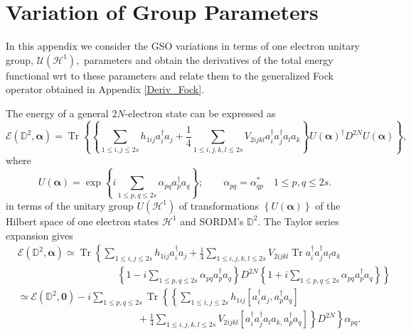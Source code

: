 \documentclass[titlepage]{article}%
\begin{document}
\section{Variation of Group Parameters\label{VarGroupPar}}

In this appendix we consider the GSO variations in terms of one electron
unitary group, $\mathcal{U}\left(  \mathcal{H}^{1}\right)  ,$ parameters and
obtain the derivatives of the total energy functional wrt to these parameters
and relate them to the generalized Fock operator obtained in Appendix
\ref{Deriv_Fock}.

The energy of a general $2N$-electron state can be expressed as
\begin{equation}
\mathcal{E}\left(  \mathbb{D}^{2},\bm{\alpha}\right)  =\operatorname{Tr}%
\left\{  \left\{  \sum_{1\leq i,j\leq2s}h_{1ij}a_{i}^{\dagger}a_{j}+\frac
{1}{4}\sum_{1\leq i,j,k,l\leq2s}V_{2ijkl}a_{i}^{\dagger}a_{j}^{\dagger}%
a_{l}a_{k}\right\}  U\left(  \bm{\alpha}\right)  ^{\dagger}D^{2N}U\left(
\bm{\alpha}\right)  \right\}  ,
\end{equation}
where
\begin{equation}
U\left(  \bm{\alpha}\right)  =\exp\left\{  i\sum_{1\leq p,q\leq2s}\alpha
_{pq}a_{p}^{\dagger}a_{q}\right\}  ;\qquad\alpha_{pq}=\alpha_{qp}^{\ast}%
\quad1\leq p,q\leq2s.
\end{equation}
in terms of the unitary group $U\left(  \mathcal{H}^{1}\right)  $ of
transformations $\left\{  U\left(  \bm{\alpha}\right)  \right\}  $ of the
Hilbert space of one electron states $\mathcal{H}^{1}$ and SORDM's
$\mathbb{D}^{2}$. The Taylor series expansion gives
\begin{align}
&  \mathcal{E}\left(  \mathbb{D}^{2},\bm{\alpha}\right)  \simeq
\operatorname{Tr}\left\{  \sum_{1\leq i,j\leq2s}h_{1ij}a_{i}^{\dagger}%
a_{j}+\frac{1}{4}\sum_{1\leq i,j,k,l\leq2s}V_{2ijkl}\operatorname{Tr}%
a_{i}^{\dagger}a_{j}^{\dagger}a_{l}a_{k}\right. \nonumber\\
&  \qquad\qquad\qquad\qquad\qquad\left.  \left\{  1-i\sum_{1\leq p,q\leq
2s}\alpha_{pq}a_{p}^{\dagger}a_{q}\right\}  D^{2N}\left\{  1+i\sum_{1\leq
p,q\leq2s}\alpha_{pq}a_{p}^{\dagger}a_{q}\right\}  \right\} \nonumber\\
&  \simeq\mathcal{E}\left(  \mathbb{D}^{2},\bm{0}\right)  -i\sum_{1\leq
p,q\leq2s}\operatorname{Tr}\left\{  \left\{  \sum_{1\leq i,j\leq2s}%
h_{1ij}\left[  a_{i}^{\dagger}a_{j},a_{p}^{\dagger}a_{q}\right]  \right.
\right. \nonumber\\
&  \qquad\qquad\qquad\qquad\qquad\qquad+\left.  \left.  \frac{1}{4}\sum_{1\leq
i,j,k,l\leq2s}V_{2ijkl}\left[  a_{i}^{\dagger}a_{j}^{\dagger}a_{l}a_{k,}%
a_{p}^{\dagger}a_{q}\right]  \right\}  D^{2N}\right\}  \alpha_{pq}.
\end{align}
\end{document}
